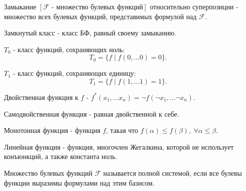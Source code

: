 \documentclass[12pt]{article}
\begin{document}
\begin{defn}
    Замыкание $[\mathcal{F} \mbox{ - множество булевых функций}]$ относительно суперпозиции - множество всех булевых функций, представимых формулой над $\mathcal{F}$.
\end{defn}
\begin{defn}
    Замкнутый класс - класс БФ, равный своему замыканию.
\end{defn}
\begin{defn}
    $T_0$ - класс функций, сохраняющих ноль:  \[
	T_0 = \{f \mid f(0, \ldots 0) = 0\}
    .\] 
\end{defn}
\begin{defn}
    $T_1$ - класс функций, сохраняющих единицу: \[
	T_1 = \{ f \mid f(1, \ldots 1) = 1\}
    .\] 
\end{defn}
\begin{defn}
    Двойственная функция к $f$ - $f^*(x_1, \ldots x_n) = \neg f(\neg x_1, \ldots \neg x_n)$.
\end{defn}
\begin{defn}
    Самодвойственная функция - равная двойственной к себе.
\end{defn}
\begin{defn}
    Монотонная функция - функция $f$,  такая что $f(\alpha ) \le f(\beta), \; \forall \alpha \le \beta$.
\end{defn}
\begin{defn}
    Линейная функция - функция, многочлен Жегалкина, которой не использует конъюнкций, а также константа ноль.
\end{defn}
\begin{defn}
    Множество булевых функций $\mathcal{F}$ называется полной системой, если все булевы функции выразимы формулами над этим базисом.
\end{defn}
\end{document}
